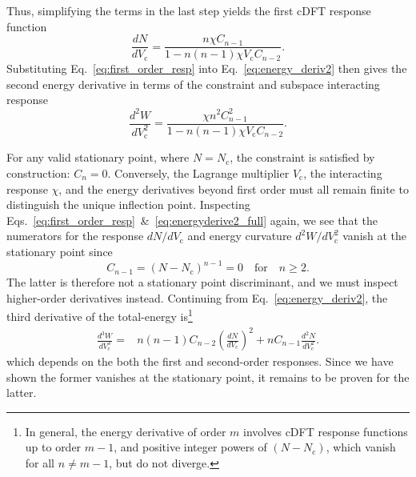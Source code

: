 %
Thus, simplifying the terms 
in the last step yields 
the first cDFT response function
%
\begin{equation}
\frac{d N}{d V_\textrm{c}}
=\frac{n \chi C_{n-1}}{ 1 - n \left( n-1 \right) \chi V_\textrm{c} C_{n-2}}.
\label{eq:first_order_resp}
\end{equation}
%
%
Substituting Eq.~\eqref{eq:first_order_resp} 
into Eq.~\eqref{eq:energy_deriv2} 
then gives the second energy derivative 
in terms of the constraint and 
subspace interacting response
%
\begin{equation}
\frac{d^2W}{dV_\textrm{c}^2}
=\frac{\chi n^2 C_{n-1}^2}{ 1 - n \left( n-1 \right) \chi V_\textrm{c} C_{n-2}}.
\label{eq:energyderive2_full}
\end{equation}
%

For any valid stationary point,
where $N=N_\textrm{c}$,  
the constraint is satisfied 
by construction: $C_n = 0$.
%
Conversely, 
the Lagrange multiplier $V_\textrm{c}$,  
the interacting response $\chi$, 
and the energy derivatives beyond first order 
must all remain finite to distinguish  
the unique inflection point.
%
Inspecting Eqs.~\eqref{eq:first_order_resp}~\&~\eqref{eq:energyderive2_full} 
again, we see that the numerators 
for the response 
$d N / d V_\textrm{c}$ 
and energy curvature 
$d^2 W / d V_\textrm{c}^2$
vanish at the stationary point since 
%
\begin{equation}
C_{n-1}=(N-N_\textrm{c})^{n-1} = 0 
\quad\mbox{for}\quad
n\geq 2.
\end{equation}
%
The latter is therefore not 
a stationary point discriminant, 
and we must inspect higher-order derivatives 
instead.
%
Continuing from Eq.~\eqref{eq:energy_deriv2}, 
the third derivative of the total-energy is\footnote{In general, 
the energy derivative of order $m$  involves cDFT
response functions up to order $m-1$, 
and positive integer powers of $( N - N_\textrm{c})$, 
which vanish for all $n\neq m-1$, 
but do not diverge.} 
%
\begin{align}
\frac{d^3 W }{ d V_\textrm{c}^3 } ={}&
n  \left(n-1\right) C_{n - 2} 
\left( \frac{d N}{d V_\textrm{c} }  \right)^2 +
 n C_{ n - 1} \frac{d^2 N}{d V_\textrm{c}^2 }.
\end{align}
%
which depends on the both the first 
and second-order responses.
%
Since we have shown the former vanishes 
at the stationary point, 
it remains to be proven for the latter.

